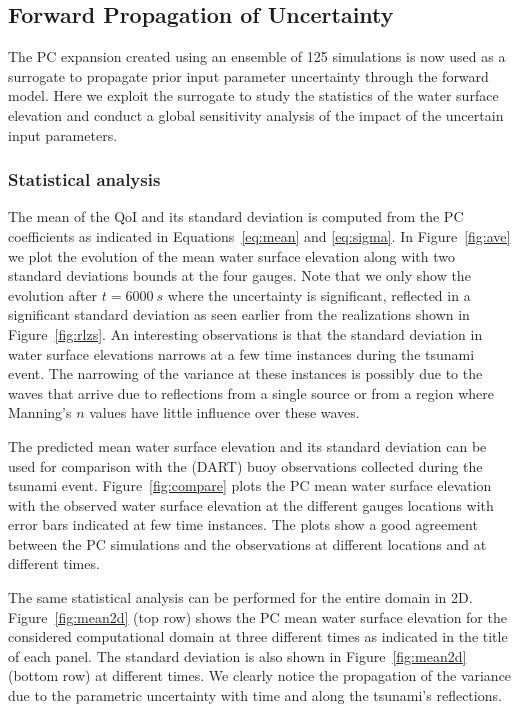 \subsection{Forward Propagation of Uncertainty}
\label{sec:forward}
The PC expansion created using an ensemble of 125 \geoclaw simulations
is now used as a surrogate to propagate prior input parameter uncertainty 
through the forward model.  Here we exploit the surrogate 
to study the statistics of the water surface elevation and conduct 
a global sensitivity analysis of the impact of the uncertain input parameters.

\subsubsection{Statistical analysis}
The mean of the QoI and its standard deviation is computed
from the PC coefficients as indicated in Equations~\eqref{eq:mean} and \eqref{eq:sigma}. 
In Figure~\ref{fig:ave} we plot the evolution of
the mean water surface elevation along with two standard deviations
bounds at the four gauges.  
Note that we only show the evolution after $t=6000~s$ where the uncertainty is significant,
reflected in a significant standard deviation as seen earlier from the realizations shown 
in Figure~\ref{fig:rlzs}. An interesting observations is that the
standard deviation in water surface elevations narrows at a few time instances
during the tsunami event.  The narrowing of the variance at these instances is
possibly due to the waves that arrive due to reflections from a single source or
from a region where Manning's $n$ values have little influence over these
waves.

The predicted mean water surface elevation  and its standard deviation 
can be used for comparison with the (DART) buoy observations collected during
the tsunami event. Figure~\ref{fig:compare} 
plots the PC mean water surface elevation with the observed 
water surface elevation at the different gauges locations
with error bars indicated at few time instances. 
The plots show a good agreement between the PC simulations and the 
observations at different locations and at different times. 

The same statistical analysis can be performed for the
entire domain in 2D. Figure~\ref{fig:mean2d} (top row) shows
the PC mean water surface elevation for the considered computational
domain at three different times as indicated in the title of each panel.
The standard deviation is also shown in Figure~\ref{fig:mean2d} (bottom row)
at different times. We clearly notice the propagation of the variance
due to the parametric uncertainty with time
and along the tsunami's reflections. 

